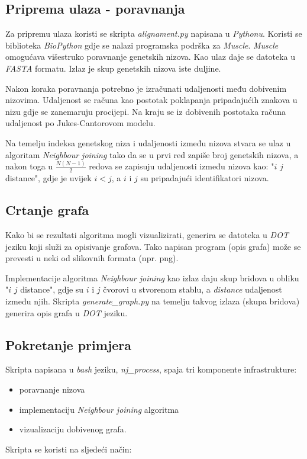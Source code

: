\documentclass[times, utf8, seminar, numeric]{fer}
\begin{document}
\subsection{Priprema ulaza - poravnanja}

Za pripremu ulaza koristi se skripta \emph{alignament.py} napisana u \emph{Pythonu}. Koristi se biblioteka \emph{BioPython} gdje se nalazi programska podrška za \emph{Muscle}. \emph{Muscle} omogućava višestruko poravnanje genetskih nizova. Kao ulaz daje se datoteka u \emph{FASTA} formatu. Izlaz je skup genetskih nizova iste duljine.
 
Nakon koraka poravnanja potrebno je izračunati udaljenosti među dobivenim nizovima. Udaljenost se računa kao postotak poklapanja pripadajućih znakova u nizu gdje se zanemaruju procijepi. Na kraju se iz dobivenih postotaka računa udaljenost po Jukes-Cantorovom modelu.

Na temelju indeksa genetskog niza i udaljenosti između nizova stvara se ulaz u algoritam  \emph{Neighbour joining} tako da se u prvi red zapiše broj genetskih nizova, a nakon toga u $\frac{N(N-1)}{2}$ redova se zapisuju udaljenosti između nizova kao: "$i$ $j$ distance", gdje je uvijek $i<j$, a $i$ i $j$ su pripadajući identifikatori nizova.

\subsection{Crtanje grafa}

Kako bi se rezultati algoritma mogli vizualizirati, generira se datoteka u \emph{DOT} jeziku koji služi za opisivanje grafova. Tako napisan program (opis grafa) može se prevesti u neki od slikovnih formata (npr. png).

Implementacije algoritma \emph{Neighbour joining} kao izlaz daju skup bridova u obliku "$i$ $j$ distance", gdje su $i$ i $j$ čvorovi u stvorenom stablu, a \emph{distance} udaljenost između njih. Skripta \emph{generate\_graph.py} na temelju takvog izlaza (skupa bridova) generira opis grafa u \emph{DOT} jeziku.

\subsection{Pokretanje primjera}

Skripta napisana u \emph{bash} jeziku, \emph{nj\_process}, spaja tri komponente infrastrukture:
\begin{itemize}
\item poravnanje nizova
\item implementaciju  \emph{Neighbour joining} algoritma
\item vizualizaciju dobivenog grafa.
\end{itemize}
Skripta se koristi na sljedeći način:
\end{document}
